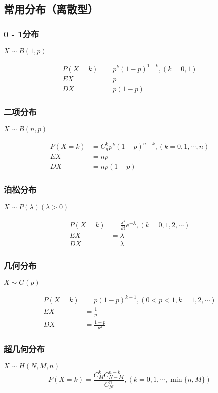 \documentclass[UTF8]{ctexart}
\theoremstyle{remark}
\begin{document}
		\subsection{常用分布（离散型）}
		\subsubsection{0 - 1分布}
		\(X \sim B(1, p)\)
		
		\begin{align*}
			P(X = k) &= p^k(1 - p)^{1 - k}, (k = 0,1)\\
			EX &= p\\
			DX &= p(1 - p)
		\end{align*}
		
		\subsubsection{二项分布}
		\(X \sim B(n, p)\)
		
		\begin{align*}
			P(X = k) &= C_{n}^{k}p^k(1 - p)^{n - k}, (k = 0,1,\cdots,n)\\
			EX &= np\\
			DX &= np(1 - p)
		\end{align*}
		
		\subsubsection{泊松分布}
		\(X \sim P(\lambda) (\lambda > 0)\)
		
		\begin{align*}
			P(X = k) &= \frac{\lambda^k}{k!}e^{-\lambda}, (k = 0,1,2,\cdots)\\
			EX &= \lambda\\
			DX &= \lambda
		\end{align*}
		
		\subsubsection{几何分布}
		\(X \sim G(p)\)
		
		\begin{align*}
			P(X = k) &= p(1 - p)^{k - 1}, (0 < p < 1, k = 1,2,\cdots)\\
			EX &= \frac{1}{p}\\
			DX &= \frac{1 - p}{p^2}
		\end{align*}
		
		\subsubsection{超几何分布}
		\(X \sim H(N, M, n)\)
		\[
		P(X = k) = \frac{C_{M}^{k}C_{N - M}^{n - k}}{C_{N}^{n}}, (k = 0,1,\cdots,\min\{n, M\})
		\]
		
\end{document}
